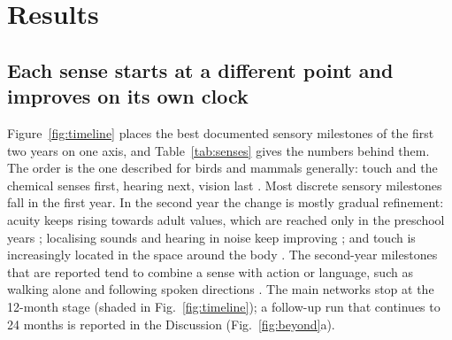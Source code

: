 \documentclass{article}
\begin{document}
\section{Results}

\subsection{Each sense starts at a different point and improves on its own clock}

Figure~\ref{fig:timeline} places the best documented sensory milestones of the first two years on one axis, and Table~\ref{tab:senses} gives the numbers behind them. The order is the one described for birds and mammals generally: touch and the chemical senses first, hearing next, vision last \autocite{turkewitz1982limitations}. Most discrete sensory milestones fall in the first year. In the second year the change is mostly gradual refinement: acuity keeps rising towards adult values, which are reached only in the preschool years \autocite{mayer1995monocular,teller1997first}; localising sounds and hearing in noise keep improving \autocite{werner2007issues}; and touch is increasingly located in the space around the body \autocite{bremner2017development}. The second-year milestones that are reported tend to combine a sense with action or language, such as walking alone and following spoken directions \autocite{zubler2022evidence}. The main networks stop at the 12-month stage (shaded in Fig.~\ref{fig:timeline}); a follow-up run that continues to 24 months is reported in the Discussion (Fig.~\ref{fig:beyond}a).
\end{document}
